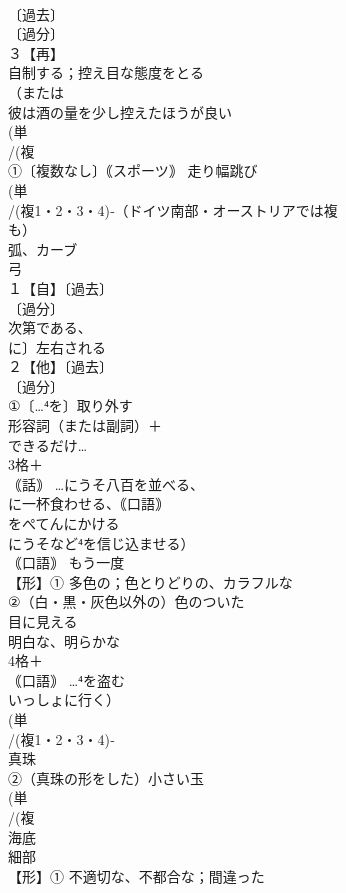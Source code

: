 \documentclass[8pt]{extreport}
\begin{document}
\begin{CJK}{UTF8}{min}
\\	〔過去〕
\\	〔過分〕
\\	３【再】
\\	自制する；控え目な態度をとる 
\\	（または
\\	彼は酒の量を少し控えたほうが良い
\\	(単
\\	/(複
\\	①〔複数なし〕｟スポーツ｠ 走り幅跳び 
\\	(単
\\	/(複1・2・3・4)‐（ドイツ南部・オーストリアでは複
\\	も） 
\\	弧、カーブ　
\\	弓 
\\	１【自】〔過去〕
\\	〔過分〕
\\	次第である、
\\	に〕左右される 
\\	２【他】〔過去〕
\\	〔過分〕
\\	①〔…⁴を〕取り外す
\\	形容詞（または副詞）＋
\\	できるだけ…
\\	3格＋
\\	｟話｠ …にうそ八百を並べる、
\\	に一杯食わせる、｟口語｠ 
\\	をぺてんにかける 
\\	にうそなど⁴を信じ込ませる）
\\	｟口語｠ もう一度
\\	【形】① 多色の；色とりどりの、カラフルな 
\\	②（白・黒・灰色以外の）色のついた 
\\	目に見える 
\\	明白な、明らかな
\\	4格＋
\\	｟口語｠ …⁴を盗む 
\\	いっしょに行く）
\\	(単
\\	/(複1・2・3・4)‐
\\	真珠 
\\	②（真珠の形をした）小さい玉 
\\	(単
\\	/(複
\\	海底 
\\	細部 
\\	【形】① 不適切な、不都合な；間違った 

\end{CJK}
\end{document}
